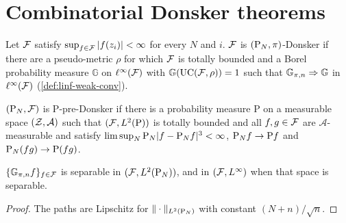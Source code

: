 \section{Combinatorial Donsker theorems}

\begin{definition}
  \label{def:han-5-4}
  Let $\mathcal{F}$ satisfy $\sup_{f\in\mathcal{F}}|f(z_i)|<\infty$ for every $N$ and $i$. $\mathcal{F}$ is $(\mathrm{P}_N,\pi)$-Donsker if there are a pseudo-metric $\rho$ for which $\mathcal{F}$ is totally bounded and a Borel probability measure $\mathbb G$ on $\ell^\infty(\mathcal{F})$ with $\mathbb G(\mathrm{UC}(\mathcal{F},\rho))=1$ such that $\mathbb{G}_{\pi,n}\Rightarrow\mathbb G$ in $\ell^\infty(\mathcal{F})$ (\cref{def:linf-weak-conv}).
\end{definition}

\begin{definition}
  \label{def:han-5-5}
  $(\mathrm{P}_N,\mathcal{F})$ is $\mathrm P$-pre-Donsker if there is a probability measure $\mathrm P$ on a measurable space $(\mathcal{Z},\mathcal A)$ such that $(\mathcal{F},L^2(\mathrm P))$ is totally bounded and all $f,g\in\mathcal{F}$ are $\mathcal A$-measurable and satisfy $\limsup_N\mathrm{P}_N|f-\mathrm{P}_N f|^3<\infty$, $\mathrm{P}_N f\to\mathrm Pf$ and $\mathrm{P}_N(fg)\to\mathrm P(fg)$.
\end{definition}

\begin{lemma}
  \label{lem:han-5-5}
  $\{\mathbb{G}_{\pi,n} f\}_{f\in\mathcal{F}}$ is separable in $(\mathcal{F},L^2(\mathrm{P}_N))$, and in $(\mathcal{F},L^\infty)$ when that space is separable.
\end{lemma}
\begin{proof}
  The paths are Lipschitz for $\|\cdot\|_{L^2(\mathrm{P}_N)}$ with constant $(N+n)/\sqrt n$.
\end{proof}

